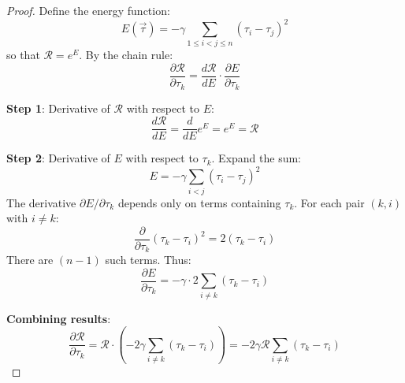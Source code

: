 \begin{proof}
Define the energy function:
\[
E(\vec{\tau}) = -\gamma \sum_{1 \leq i < j \leq n} (\tau_i - \tau_j)^2
\]
so that $\mathcal{R} = e^{E}$. By the chain rule:
\[
\frac{\partial \mathcal{R}}{\partial \tau_k} = \frac{d\mathcal{R}}{dE} \cdot \frac{\partial E}{\partial \tau_k}
\]

\textbf{Step 1}: Derivative of $\mathcal{R}$ with respect to $E$:
\[
\frac{d\mathcal{R}}{dE} = \frac{d}{dE} e^E = e^E = \mathcal{R}
\]

\textbf{Step 2}: Derivative of $E$ with respect to $\tau_k$. Expand the sum:
\[
E = -\gamma \sum_{i<j} (\tau_i - \tau_j)^2
\]
The derivative $\partial E / \partial \tau_k$ depends only on terms containing $\tau_k$. For each pair $(k,i)$ with $i \neq k$:
\[
\frac{\partial}{\partial \tau_k} (\tau_k - \tau_i)^2 = 2(\tau_k - \tau_i)
\]
There are $(n-1)$ such terms. Thus:
\[
\frac{\partial E}{\partial \tau_k} = -\gamma \cdot 2 \sum_{i \neq k} (\tau_k - \tau_i)
\]

\textbf{Combining results}:
\[
\frac{\partial \mathcal{R}}{\partial \tau_k} = \mathcal{R} \cdot \left(-2\gamma \sum_{i \neq k} (\tau_k - \tau_i)\right) = -2\gamma \mathcal{R} \sum_{i \neq k} (\tau_k - \tau_i)
\]
\end{proof}